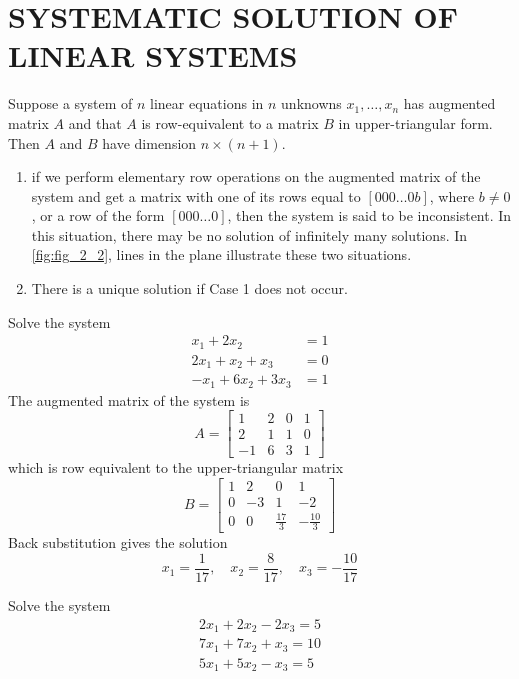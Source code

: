 \documentclass[../main.tex]{subfiles}
\begin{document}
\section[Systematic Solutions of Linear Systems]{SYSTEMATIC SOLUTION OF LINEAR SYSTEMS}
Suppose a system of $n$ linear equations in $n$ unknowns $x_{1}, \ldots, x_{n}$ has augmented matrix $A$ and that $A$ is row-equivalent to a matrix $B$ in upper-triangular form. Then $A$ and $B$ have dimension $n \times(n+1)$.

\begin{enumerate}[label=Case \arabic* : ]
	\item if we perform elementary row operations on the augmented matrix of the system and get a matrix with one of its rows equal to $[000 \ldots 0 b]$, where $b \neq 0$, or a row of the form $[000 \ldots 0]$, then the system is said to be inconsistent. In this situation, there may be no solution of infinitely many solutions. In \autoref{fig:fig_2_2}, lines in the plane illustrate these two situations.

	\item There is a unique solution if Case 1 does not occur.
\end{enumerate}

\begin{example} Solve the system
$$
\begin{aligned}
x_{1}+2 x_{2} &=1 \\
2 x_{1}+x_{2}+x_{3} &=0 \\
-x_{1}+6 x_{2}+3 x_{3} &=1
\end{aligned}
$$
The augmented matrix of the system is
$$
A=\left[\begin{array}{ccc|c}
1 & 2 & 0 & 1 \\
2 & 1 & 1 & 0 \\
-1 & 6 & 3 & 1
\end{array}\right]
$$
which is row equivalent to the upper-triangular matrix
$$
B=\left[\begin{array}{ccc|c}
1 & 2 & 0 & 1 \\
0 & -3 & 1 & -2 \\
0 & 0 & \frac{17}{3} & -\frac{10}{3}
\end{array}\right]
$$
Back substitution gives the solution
$$
x_{1}=\frac{1}{17}, \quad x_{2}=\frac{8}{17}, \quad x_{3}=-\frac{10}{17}
$$
\end{example}

Solve the system
$$
\begin{array}{c}
2 x_{1}+2 x_{2}-2 x_{3}=5 \\
7 x_{1}+7 x_{2}+x_{3}=10 \\
5 x_{1}+5 x_{2}-x_{3}=5
\end{array}
$$
\end{document}
